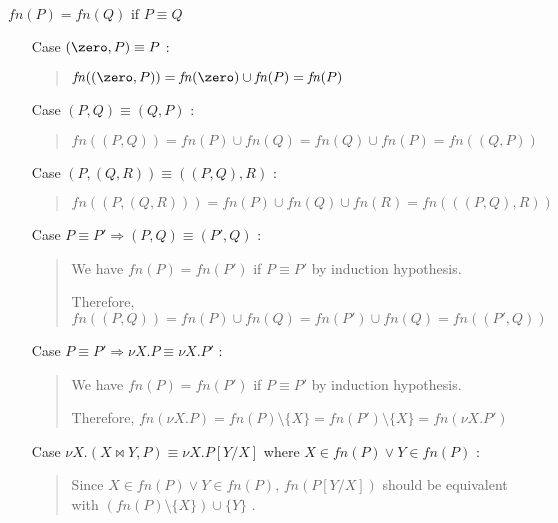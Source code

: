 \begin{frame}[allowframebreaks]{
    $\mathit{fn}(P) = \mathit{fn}(Q) \mbox{ if } P \equiv Q$
  }
  \scriptsize  
  \begin{itemize}
  \item[Case] \((\zero, P) \equiv P\) :\\
    \begin{quote}
      \(\mathit{fn}((\zero, P))
      = \mathit{fn}(\zero) \cup \mathit{fn}(P)
      = \mathit{fn}(P)\)
    \end{quote}
  \item[Case] \((P, Q) \equiv (Q, P)\) :\\
    \begin{quote}
      \(
      \mathit{fn}((P, Q))
      = \mathit{fn}(P) \cup \mathit{fn}(Q)
      = \mathit{fn}(Q) \cup \mathit{fn}(P)
      = \mathit{fn}((Q, P)) 
      \)
    \end{quote}
  \item[Case] \((P, (Q, R)) \equiv ((P, Q), R)\) :\\
    \begin{quote}
      \(
      \mathit{fn}((P, (Q, R)))
      = \mathit{fn}(P) \cup \mathit{fn}(Q) \cup \mathit{fn}(R)
      = \mathit{fn}(((P, Q), R))
      \)
    \end{quote}
  \item[Case] \(P \equiv P' \Rightarrow (P, Q) \equiv (P', Q)\) :\\
    \begin{quote}
      We have \(\mathit{fn}(P) = \mathit{fn}(P')\) if \(P \equiv P'\)
      by induction hypothesis.

      Therefore,
      \(
      \mathit{fn}((P, Q))
      = \mathit{fn}(P) \cup \mathit{fn}(Q)
      = \mathit{fn}(P') \cup \mathit{fn}(Q)
      = \mathit{fn}((P', Q))
      \)
    \end{quote}
  \item[Case] \(P \equiv P' \Rightarrow \nu X.P \equiv \nu X.P'\) :\\
    \begin{quote}
      We have \(\mathit{fn}(P) = \mathit{fn}(P')\) if \(P \equiv P'\)
      by induction hypothesis.
      
      Therefore,
      \(
      \mathit{fn}(\nu X.P)
      = \mathit{fn}(P) \setminus \{X\}
      = \mathit{fn}(P') \setminus \{X\}
      = \mathit{fn}(\nu X.P')
      \)
    \end{quote}
  \item[Case] \(\nu X.(X \bowtie Y, P) \equiv \nu X.P[Y / X]\)
    where \(X \in \mathit{fn}(P) \lor Y \in \mathit{fn}(P)\) :\\
    \begin{quote}
      Since \(X \in \mathit{fn}(P) \lor Y \in \mathit{fn}(P)\),
      \(\mathit{fn}(P[Y/X])\) should be equivalent with
      \((\mathit{fn}(P) \setminus \{X\}) \cup \{Y\} \)
      .
      

\end{quote}
\end{itemize}
\end{frame}
